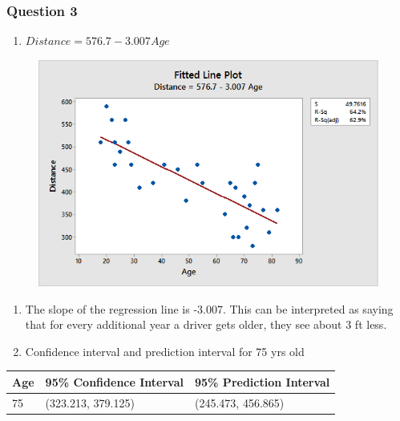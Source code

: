 \documentclass{article}
\providecommand{\tightlist}{%
      \setlength{\itemsep}{0pt}\setlength{\parskip}{0pt}}
\begin{document}
    \subsubsection{Question 3}\label{question-3}

\begin{enumerate}
\def\labelenumi{\alph{enumi}.}
\tightlist
\item
  \(Distance = 576.7 - 3.007 Age\)
\end{enumerate}

\begin{figure}[h!]
 \centering
 \includegraphics[scale=.5]{./images/scatterplot+regression_distance-vs-age.png}
\end{figure}


\begin{enumerate}
\def\labelenumi{\alph{enumi}.}
\setcounter{enumi}{1}
\item
  The slope of the regression line is -3.007. This can be interpreted as
  saying that for every additional year a driver gets older, they see
  about 3 ft less.
\item
  Confidence interval and prediction interval for 75 yrs old
\end{enumerate}

\begin{longtable}[c]{@{}lll@{}}
\toprule
Age & 95\% Confidence Interval & 95\% Prediction Interval\tabularnewline
\midrule
\endhead
75 & (323.213, 379.125) & (245.473, 456.865)\tabularnewline
\bottomrule
\end{longtable}
\end{document}
